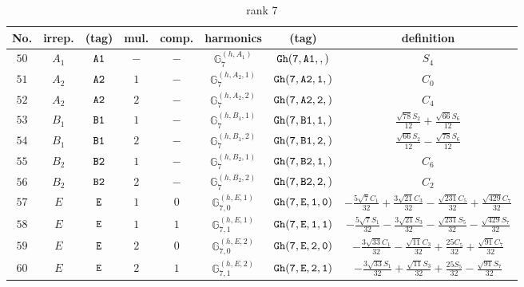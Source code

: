 \documentclass[fleqn,8pt]{jsarticle}
\begin{document}
\begin{table}[ht!]
\begin{center}
\caption{rank 7}
\renewcommand{\arraystretch}{1.3}
\begin{tabular}{cccccccc} \hline \hline
No. & irrep. & (tag) & mul. & comp. & harmonics & (tag) & definition \\ \hline
$ 50 $ & $ A_{1} $ & $ {\tt A1} $ & $ - $ & $ - $ & $ \mathbb{G}_{7}^{(h,A_{1})} $ & $ {\tt Gh(7,A1,,)} $ & $ S_{4} $ \\
$ 51 $ & $ A_{2} $ & $ {\tt A2} $ & $ 1 $ & $ - $ & $ \mathbb{G}_{7}^{(h,A_{2},1)} $ & $ {\tt Gh(7,A2,1,)} $ & $ C_{0} $ \\
$ 52 $ & $ A_{2} $ & $ {\tt A2} $ & $ 2 $ & $ - $ & $ \mathbb{G}_{7}^{(h,A_{2},2)} $ & $ {\tt Gh(7,A2,2,)} $ & $ C_{4} $ \\
$ 53 $ & $ B_{1} $ & $ {\tt B1} $ & $ 1 $ & $ - $ & $ \mathbb{G}_{7}^{(h,B_{1},1)} $ & $ {\tt Gh(7,B1,1,)} $ & $ \frac{\sqrt{78} S_{2}}{12} + \frac{\sqrt{66} S_{6}}{12} $ \\
$ 54 $ & $ B_{1} $ & $ {\tt B1} $ & $ 2 $ & $ - $ & $ \mathbb{G}_{7}^{(h,B_{1},2)} $ & $ {\tt Gh(7,B1,2,)} $ & $ \frac{\sqrt{66} S_{2}}{12} - \frac{\sqrt{78} S_{6}}{12} $ \\
$ 55 $ & $ B_{2} $ & $ {\tt B2} $ & $ 1 $ & $ - $ & $ \mathbb{G}_{7}^{(h,B_{2},1)} $ & $ {\tt Gh(7,B2,1,)} $ & $ C_{6} $ \\
$ 56 $ & $ B_{2} $ & $ {\tt B2} $ & $ 2 $ & $ - $ & $ \mathbb{G}_{7}^{(h,B_{2},2)} $ & $ {\tt Gh(7,B2,2,)} $ & $ C_{2} $ \\
$ 57 $ & $ E $ & $ {\tt E} $ & $ 1 $ & $ 0 $ & $ \mathbb{G}_{7,0}^{(h,E,1)} $ & $ {\tt Gh(7,E,1,0)} $ & $ - \frac{5 \sqrt{7} C_{1}}{32} + \frac{3 \sqrt{21} C_{3}}{32} - \frac{\sqrt{231} C_{5}}{32} + \frac{\sqrt{429} C_{7}}{32} $ \\
$ 58 $ & $ E $ & $ {\tt E} $ & $ 1 $ & $ 1 $ & $ \mathbb{G}_{7,1}^{(h,E,1)} $ & $ {\tt Gh(7,E,1,1)} $ & $ - \frac{5 \sqrt{7} S_{1}}{32} - \frac{3 \sqrt{21} S_{3}}{32} - \frac{\sqrt{231} S_{5}}{32} - \frac{\sqrt{429} S_{7}}{32} $ \\
$ 59 $ & $ E $ & $ {\tt E} $ & $ 2 $ & $ 0 $ & $ \mathbb{G}_{7,0}^{(h,E,2)} $ & $ {\tt Gh(7,E,2,0)} $ & $ - \frac{3 \sqrt{33} C_{1}}{32} - \frac{\sqrt{11} C_{3}}{32} + \frac{25 C_{5}}{32} + \frac{\sqrt{91} C_{7}}{32} $ \\
$ 60 $ & $ E $ & $ {\tt E} $ & $ 2 $ & $ 1 $ & $ \mathbb{G}_{7,1}^{(h,E,2)} $ & $ {\tt Gh(7,E,2,1)} $ & $ - \frac{3 \sqrt{33} S_{1}}{32} + \frac{\sqrt{11} S_{3}}{32} + \frac{25 S_{5}}{32} - \frac{\sqrt{91} S_{7}}{32} $ \\

\end{tabular}
\end{center}
\end{table}
\end{document}
